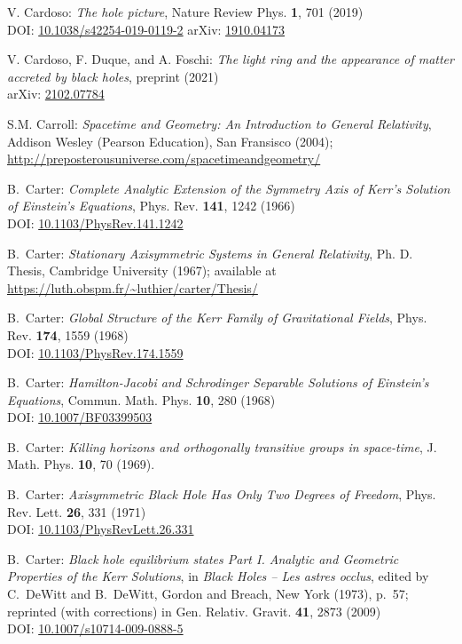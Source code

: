 \begin{thebibliography}{123}
V. Cardoso:
{\em The hole picture},
Nature Review Phys. {\bf 1}, 701 (2019)\\
DOI: \href{https://doi.org/10.1038/s42254-019-0119-2}{10.1038/s42254-019-0119-2}\hfill
arXiv: \href{https://arxiv.org/abs/1910.04173}{1910.04173}

V. Cardoso, F. Duque, and A. Foschi:
{\em The light ring and the appearance of matter accreted by black holes},
preprint (2021)\\
arXiv: \href{https://arxiv.org/abs/2102.07784}{2102.07784}

S.M. Carroll: \emph{Spacetime and Geometry: An Introduction to General Relativity},
Addison Wesley (Pearson Education), San Fransisco (2004); \\
\url{http://preposterousuniverse.com/spacetimeandgeometry/}

B.~Carter:
{\em Complete Analytic Extension of the Symmetry Axis of Kerr's Solution of Einstein's Equations},
Phys. Rev. {\bf 141}, 1242 (1966)\\
DOI: \href{https://doi.org/10.1103/PhysRev.141.1242}{10.1103/PhysRev.141.1242}

B.~Carter: {\em Stationary Axisymmetric Systems in General Relativity},
Ph. D. Thesis, Cambridge University (1967); available at\\
\url{https://luth.obspm.fr/~luthier/carter/Thesis/}

B.~Carter:
{\em Global Structure of the Kerr Family of Gravitational Fields},
Phys. Rev. {\bf 174}, 1559 (1968)\\
DOI: \href{https://doi.org/10.1103/PhysRev.174.1559}{10.1103/PhysRev.174.1559}

B.~Carter:
{\em Hamilton-Jacobi and Schrodinger Separable Solutions of Einstein's Equations},
Commun. Math. Phys. {\bf 10}, 280 (1968)\\
DOI: \href{https://doi.org/10.1007/BF03399503}{10.1007/BF03399503}

B.~Carter: {\em Killing horizons and orthogonally transitive groups
in space-time},
J. Math. Phys. {\bf 10}, 70 (1969).

B.~Carter: {\em Axisymmetric Black Hole Has Only Two Degrees of Freedom},
Phys. Rev. Lett. {\bf 26}, 331 (1971)\\
DOI: \href{https://doi.org/10.1103/PhysRevLett.26.331}{10.1103/PhysRevLett.26.331}

B.~Carter: {\em Black hole equilibrium states Part I.
Analytic and Geometric Properties of the Kerr Solutions},
in {\em Black Holes -- Les astres occlus},  edited by C.~DeWitt and B.~DeWitt,
Gordon and Breach, New York (1973), p.~57; reprinted (with corrections) in
Gen. Relativ. Gravit. {\bf 41}, 2873 (2009)\\
DOI: \href{https://doi.org/10.1007/s10714-009-0888-5}{10.1007/s10714-009-0888-5}


\end{thebibliography}

